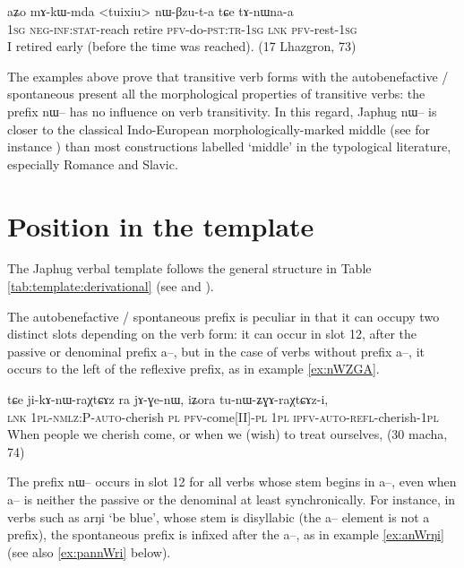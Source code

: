 \documentclass[oldfontcommands,oneside,a4paper,11pt]{article}
\newcommand{\ipa}[1]{{\phon \mbox{#1}}} %
\begin{document}
 \begin{exe}
\ex \label{ex:tuixiu.nWBzuta}
\gll 
\ipa{aʑo} 	\ipa{mɤ-kɯ-mda} 	<tuixiu> 	\ipa{nɯ-βzu-t-a} \ipa{tɕe} 	\ipa{tɤ-nɯna-a} \\
\textsc{1sg} \textsc{neg-inf:stat}-reach retire \textsc{pfv}-do-\textsc{pst:tr-1sg} \textsc{lnk} \textsc{pfv}-rest-\textsc{1sg} \\
\glt I retired early (before the time was reached). (17 Lhazgron, 73)
\end{exe} 

The examples above prove that transitive verb forms with the autobenefactive / spontaneous present all the morphological  properties of transitive verbs: the prefix \ipa{nɯ--} has no influence on verb transitivity. In this regard, Japhug \ipa{nɯ--} is closer to the classical Indo-European morphologically-marked middle (see for instance  \citealt[19]{pooth14diathesen}) than most constructions labelled `middle' in the typological literature, especially Romance and Slavic.

\section{Position in the template}
The Japhug verbal template follows the general structure in Table \ref{tab:template:derivational} (see \citealt{jacques12incorp} and \citealt{jacques13harmonization}). 

The autobenefactive / spontaneous prefix is peculiar in that it can occupy two distinct slots depending on the verb form: it can occur  in slot 12, after the passive or denominal prefix \ipa{a--}, but in the case of verbs without prefix \ipa{a--}, it occurs to the left of the reflexive prefix, as in example \ref{ex:nWZGA}.

\begin{exe}
\ex \label{ex:nWZGA}
\gll 
\ipa{tɕe}  	\ipa{ji-kɤ-nɯ-raχtɕɤz}  	\ipa{ra}  	\ipa{jɤ-ɣe-nɯ,}  	\ipa{iʑora}  	\ipa{tu-nɯ-ʑɣɤ-raχtɕɤz-i,}  \\
\textsc{lnk} \textsc{1pl-nmlz:P-auto}-cherish \textsc{pl} \textsc{pfv}-come[II]-\textsc{pl} \textsc{1pl} \textsc{ipfv-auto-refl}-cherish-\textsc{1pl} \\
\glt When people we cherish come, or when we (wish) to treat ourselves, (30 macha, 74)
\end{exe}

The prefix \ipa{nɯ--} occurs in slot 12 for all verbs whose stem begins in \ipa{a--}, even when   \ipa{a--} is neither the passive or the denominal at least synchronically. For instance, in verbs such as \ipa{arŋi} `be blue', whose stem is disyllabic (the \ipa{a--} element is not a prefix), the spontaneous prefix is infixed after the \ipa{a--}, as in  example \ref{ex:anWrŋi} (see also \ref{ex:pannWri} below).
\end{document}
